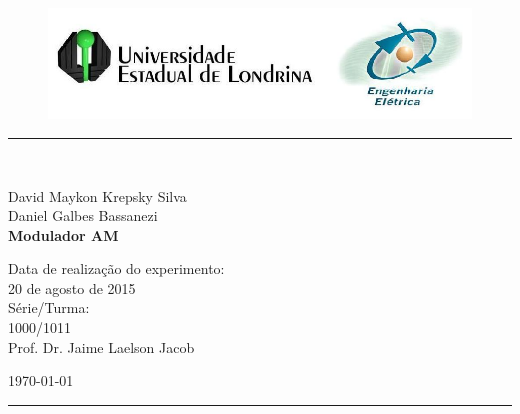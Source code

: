 \begin{titlepage}
\begin{center}
\begin{figure}[h]
\includegraphics[scale=0.76]{Imagens/topdotitulo.png}
\end{figure}
\rule{\columnwidth}{1.5mm}
\

\large David Maykon Krepsky Silva\\
\large Daniel Galbes Bassanezi\\

\vspace{4cm}
{\bf \Large Modulador AM}
\vspace{3.5cm}

\begin{flushright}
Data de realização do experimento:\\
20 de agosto de 2015\\
Série/Turma:\\
1000/1011\\
Prof. Dr. Jaime Laelson Jacob 
\end{flushright}

\vspace{3.2cm}
\today

\rule{\columnwidth}{1.3mm}
\end{center}
\end{titlepage}
